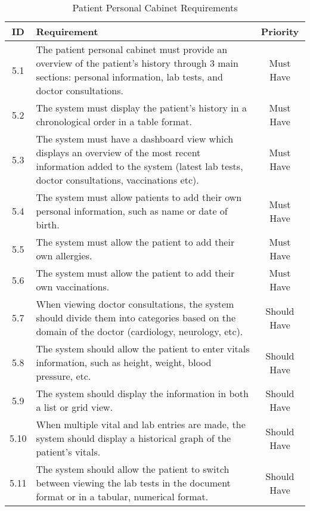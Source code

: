 \begin{table}[htbp]
    \centering
    \begin{tabular}{|c|p{10cm}|c|}
    \hline
    \textbf{ID}  & \textbf{Requirement}  & \textbf{Priority} \\ \hline
    5.1  & The patient personal cabinet must provide an overview of the patient's history through 3 main sections: personal information, lab tests, and doctor consultations. & Must Have \\ \hline
    5.2  & The system must display the patient's history in a chronological order in a table format. & Must Have \\ \hline
    5.3 & The system must have a dashboard view which displays an overview of the most recent information added to the system (latest lab tests, doctor consultations, vaccinations etc). & Must Have \\ \hline
    5.4  & The system must allow patients to add their own personal information, such as name or date of birth. & Must Have \\ \hline
    5.5  & The system must allow the patient to add their own allergies. & Must Have \\ \hline
    5.6  & The system must allow the patient to add their own vaccinations. & Must Have \\ \hline
    5.7  & When viewing doctor consultations, the system should divide them into categories based on the domain of the doctor (cardiology, neurology, etc). & Should Have \\ \hline
    5.8  & The system should allow the patient to enter vitals information, such as height, weight, blood pressure, etc. & Should Have \\ \hline
    5.9  & The system should display the information in both a list or grid view. & Should Have \\ \hline
    5.10  & When multiple vital and lab entries are made, the system should display a historical graph of the patient's vitals. & Should Have \\ \hline
    5.11 & The system should allow the patient to switch between viewing the lab tests in the document format or in a tabular, numerical format. & Should Have \\ \hline
    \end{tabular}
    \caption{Patient Personal Cabinet Requirements}
\end{table}

